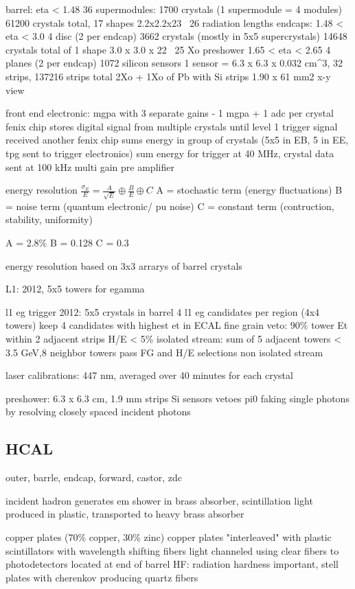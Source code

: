 \documentclass[oneside, letterpaper, oldfontcommands]{memoir}
\begin{document}
barrel: eta < 1.48
	36 supermodules: 1700 crystals (1 supermodule = 4 modules)
	61200 crystals total, 17 shapes
	2.2x2.2x23 ~26 radiation lengths
endcaps: 1.48 < eta < 3.0
		 4 disc (2 per endcap) 3662 crystals (mostly in 5x5 supercrystals)
		 14648 crystals total of 1 shape
		 3.0 x 3.0 x 22 ~25 Xo
preshower 1.65 < eta < 2.65
		 4 planes (2 per endcap) 1072 silicon sensors
		 1 sensor = 6.3 x 6.3 x 0.032 cm^3, 32 strips, 137216 strips total
		 2Xo + 1Xo of Pb with Si strips
		 1.90 x 61 mm2 x-y view
		 
front end electronic: mgpa with 3 separate gains
- 1 mgpa + 1 adc per crystal
fenix chip stores digital signal from multiple crystals until level 1 trigger signal received
another fenix chip sums energy in group of crystals (5x5 in EB, 5 in EE, tpg sent to trigger electronics)
sum energy for trigger at 40 MHz, crystal data sent at 100 kHz
multi gain pre amplifier 

energy resolution 
$\frac{\sigma_{E}}{E} = \frac{A}{\sqrt{E}} \oplus \frac{B}{E} \oplus C$
A = stochastic term (energy fluctuations)
B = noise term (quantum electronic/ pu noise)
C = constant term (contruction, stability, uniformity)

A = 2.8\%
B = 0.128
C = 0.3

energy resolution based on 3x3 arrarys of barrel crystals

L1: 2012, 5x5 towers for egamma

l1 eg trigger 2012: 
5x5 crystals in barrel
4 l1 eg candidates per region (4x4 towers)
keep 4 candidates with highest et in ECAL
fine grain veto: 90\% tower Et within 2 adjacent strips
H/E < 5\%
isolated stream: sum of 5 adjacent towers < 3.5 GeV,8 neighbor towers pass FG and H/E selections
non isolated stream

laser calibrations: 447 nm, averaged over 40 minutes for each crystal

preshower: 6.3 x 6.3 cm, 1.9 mm strips Si sensors
vetoes pi0 faking single photons by resolving closely spaced incident photons

\subsection{HCAL}\label{hcal}
outer, barrle, endcap, forward, castor, zdc

incident hadron generates em shower in brass absorber, scintillation light produced in plastic,
transported to heavy brass absorber

copper plates (70\% copper, 30\% zinc)
copper plates "interleaved" with plastic scintillators with wavelength shifting fibers
light channeled using clear fibers to photodetectors located at end of barrel
HF: radiation hardness important, stell plates with cherenkov producing quartz fibers
\end{document}
